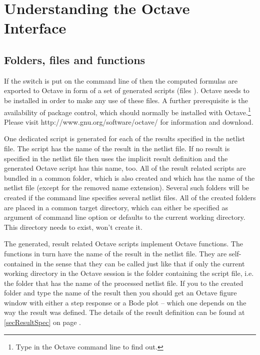 \chapter{Understanding the Octave Interface}
\label{secOctaveInterface}

\section{Folders, files and functions}

If the switch  is put on the command line of \linnet{} then the
computed formulas are exported to Octave in form of a set of generated
scripts (files ). Octave needs to be installed in order to make
any use of these files. A further prerequisite is the availability of
package control, which should normally be installed with
Octave.\footnote{Type  in the Octave command line to find
out.} Please visit http://www.gnu.org/software/octave/ for information and
download.

One dedicated script is generated for each of the results specified in the
netlist file. The script has the name of the result in the netlist file.
If no result is specified in the netlist file then \linnet{} uses the
implicit result definition  and the generated Octave
script has this name, too. All of the result related scripts are bundled
in a common folder, which is also created and which has the name of the
netlist file (except for the removed name extension). Several such folders
will be created if the \linnet{} command line specifies several netlist
files. All of the created folders are placed in a common target directory,
which can either be specified as argument of command line option 
or defaults to the current working directory. This directory needs to
exist, \linnet{} won't create it.

The generated, result related Octave scripts implement Octave functions.
The functions in turn have the name of the result in the netlist file.
They are self-contained in the sense that they can be called just like
that if only the current working directory in the Octave session is the
folder containing the script file, i.e. the folder that has the name of
the processed netlist file. If you  to the created folder and
type the name of the result then you should get an Octave figure window
with either a step response or a Bode plot -- which one depends on the way
the result was defined. The details of the result definition can be found
at \ref{secResultSpec} on page \pageref{secResultSpec}.

